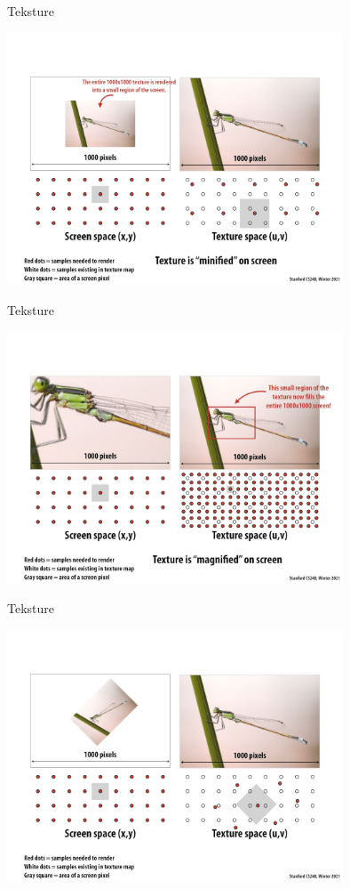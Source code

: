 \documentclass[9pt]{beamer}
\begin{document}
\begin{frame}{Teksture}
	\begin{center}
		\includegraphics[width=10cm]{./slike/slide_051.jpg}
	\end{center}
\end{frame}

\begin{frame}{Teksture}
	\begin{center}
		\includegraphics[width=10cm]{./slike/slide_052.jpg}
	\end{center}
\end{frame}

\begin{frame}{Teksture}
	\begin{center}
		\includegraphics[width=10cm]{./slike/slide_053.jpg}
	\end{center}
\end{frame}
\end{document}
